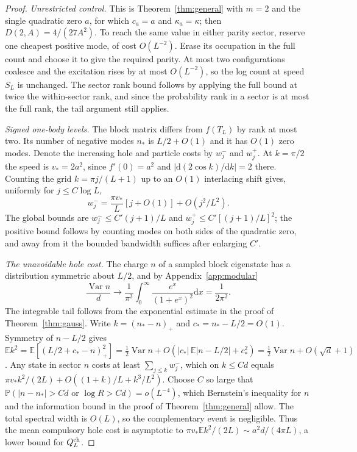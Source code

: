 \documentclass[11pt,a4paper]{article}
\theoremstyle{remark}
\newcommand{\E}{\mathbb E}
\newcommand{\Prob}{\mathbb P}
\newcommand{\dd}{\mathrm d}
\begin{document}
\begin{proof}
\emph{Unrestricted control.} This is Theorem~\ref{thm:general} with $m=2$ and the single quadratic zero $a$, for which $c_a=a$ and $\kappa_a=\kappa$; then $D(2,A)=4/(27A^2)$. To reach the same value in either parity sector, reserve one cheapest positive mode, of cost $O(L^{-2})$. Erase its occupation in the full count and choose it to give the required parity. At most two configurations coalesce and the excitation rises by at most $O(L^{-2})$, so the log count at speed $S_L$ is unchanged. The sector rank bound follows by applying the full bound at twice the within-sector rank, and since the probability rank in a sector is at most the full rank, the tail argument still applies.

\emph{Signed one-body levels.} The block matrix differs from $f(T_L)$ by rank at most two. Its number of negative modes $n_*$ is $L/2+O(1)$ and it has $O(1)$ zero modes. Denote the increasing hole and particle costs by $w_j^-$ and $w_j^+$. At $k=\pi/2$ the speed is $v_*=2a^2$, since $f'(0)=a^2$ and $|\dd(2\cos k)/\dd k|=2$ there. Counting the grid $k=\pi j/(L+1)$ up to an $O(1)$ interlacing shift gives, uniformly for $j\le C\log L$,
\[
 w_j^-=\frac{\pi v_*}{L}[j+O(1)]+O(j^2/L^2).
\]
The global bounds are $w_j^-\le C'(j+1)/L$ and $w_j^+\le C'[(j+1)/L]^2$; the positive bound follows by counting modes on both sides of the quadratic zero, and away from it the bounded bandwidth suffices after enlarging $C'$.

\emph{The unavoidable hole cost.} The charge $n$ of a sampled block eigenstate has a distribution symmetric about $L/2$, and by Appendix~\ref{app:modular}
\[
 \frac{\operatorname{Var}n}{d}\to
 \frac{1}{\pi^2}\int_0^\infty \frac{e^x}{(1+e^x)^2}\dd x=\frac{1}{2\pi^2}.
\]
The integrable tail follows from the exponential estimate in the proof of Theorem~\ref{thm:gauss}. Write $k=(n_*-n)_+$ and $c_*=n_*-L/2=O(1)$. Symmetry of $n-L/2$ gives $\E k^2=\E[(L/2+c_*-n)_+^2]=\tfrac12\operatorname{Var}n+O(|c_*|\,\E|n-L/2|+c_*^2)=\tfrac12\operatorname{Var}n+O(\sqrt d+1)$. Any state in sector $n$ costs at least $\sum_{j\le k}w_j^-$, which on $k\le Cd$ equals $\pi v_* k^2/(2L)+O((1+k)/L+k^3/L^2)$. Choose $C$ so large that $\Prob(|n-n_*|>Cd\text{ or }\log R>Cd)=o(L^{-4})$, which Bernstein's inequality for $n$ and the information bound in the proof of Theorem~\ref{thm:general} allow. The total spectral width is $O(L)$, so the complementary event is negligible. Thus the mean compulsory hole cost is asymptotic to $\pi v_*\E k^2/(2L)\sim a^2 d/(4\pi L)$, a lower bound for $Q_L^{\rm ch}$.


\end{proof}
\end{document}
